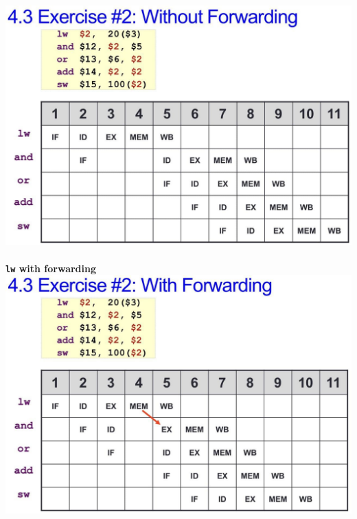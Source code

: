 \documentclass[a4paper]{article} \usepackage[backend=biber, style=numeric, sorting=none]{biblatex}
\begin{document}
\begin{multicols*}{4}
\includegraphics[width=0.90\columnwidth]{lw_without_forwarding.jpg}
\textbf{\texttt{\\\\lw} with forwarding\\}
\includegraphics[width=0.90\columnwidth]{lw_with_forwarding.jpg}


\end{multicols*}
\end{document}
